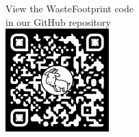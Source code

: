 \documentclass[a0paper,fleqn]{betterposter}
\begin{document}
{\begin{center}
    \vspace{30pt}
    {\fontsize{36}{40}\selectfont View the WasteFootprint code\\ in our GitHub repository\\}
    \vspace{10pt}
    \includegraphics[width=0.3\textwidth]{img/qr-code.pdf}
    \end{center}
}
\end{document}

